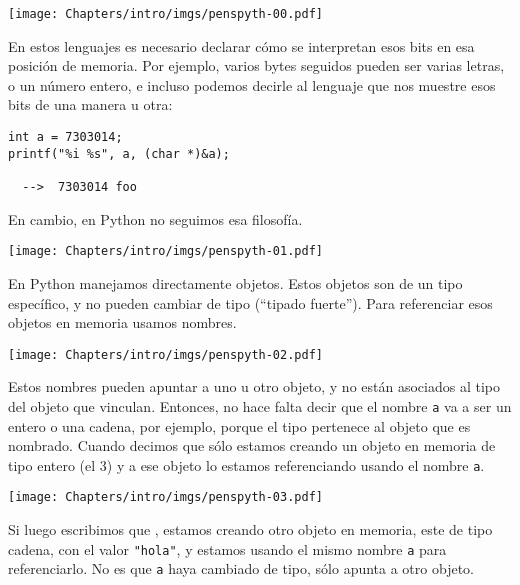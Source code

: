\begin{center}
    \texttt{[image: Chapters/intro/imgs/penspyth-00.pdf]}
\end{center}

En estos lenguajes es necesario declarar cómo se interpretan esos bits en esa posición de memoria. Por ejemplo, varios bytes seguidos pueden ser varias letras, o un número entero, e incluso podemos decirle al lenguaje que nos muestre esos bits de una manera u otra:

\begin{verbatim}
int a = 7303014;
printf("%i %s", a, (char *)&a);

  -->  7303014 foo
\end{verbatim}

En cambio, en Python no seguimos esa filosofía.

\begin{center}
    \texttt{[image: Chapters/intro/imgs/penspyth-01.pdf]}
\end{center}

En Python manejamos directamente objetos. Estos objetos son de un tipo específico, y no pueden cambiar de tipo (``tipado fuerte''). Para referenciar esos objetos en memoria usamos nombres. 

\begin{center}
    \texttt{[image: Chapters/intro/imgs/penspyth-02.pdf]}
\end{center}

Estos nombres pueden apuntar a uno u otro objeto, y no están asociados al tipo del objeto que vinculan. Entonces, no hace falta decir que el nombre \verb|a| va a ser un entero o una cadena, por ejemplo, porque el tipo pertenece al objeto que es nombrado. Cuando decimos que  sólo estamos creando un objeto en memoria de tipo entero (el 3) y a ese objeto lo estamos referenciando usando el nombre \verb|a|. 

\begin{center}
    \texttt{[image: Chapters/intro/imgs/penspyth-03.pdf]}
\end{center}

Si luego escribimos que , estamos creando otro objeto en memoria, este de tipo cadena, con el valor \verb|"hola"|, y estamos usando el mismo nombre \verb|a| para referenciarlo. No es que \verb|a| haya cambiado de tipo, sólo apunta a otro objeto.

